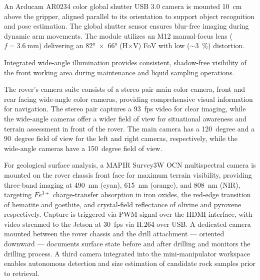 
An Arducam AR0234 color global shutter USB 3.0 camera is mounted \qty{10}{\centi\metre} above the gripper, aligned parallel to its orientation to support object recognition and pose estimation. The global shutter sensor ensures blur-free imaging during dynamic arm movements. The module utilizes an M12 manual-focus lens ($f = \qty{3.6}{\milli\metre}$) delivering an \ang{82}~$\times$~\ang{66} (H$\times$V) FoV with low ($\sim$\qty{3}{\percent}) distortion.

Integrated wide-angle illumination provides consistent, shadow-free visibility of the front working area during maintenance and liquid sampling operations.


The rover's camera suite consists of a stereo pair main color camera, front and rear facing wide-angle color cameras, providing comprehensive visual information for navigation. The stereo pair captures a  \qty{93}{fps} video for clear imaging, while the wide-angle cameras offer a wider field of view for situational awareness and terrain assessment in front of the rover. The main camera has a \qty{120}{degree} and a \qty{90}{degree} field of view for the left and right cameras, respectively, while the wide-angle cameras have a \qty{150}{degree} field of view.

For geological surface analysis, a MAPIR Survey3W OCN multispectral camera is mounted on the rover chassis front face for maximum terrain visibility, providing three-band imaging at \qty{490}{\nano\metre} (cyan), \qty{615}{\nano\metre} (orange), and \qty{808}{\nano\metre} (NIR), targeting $Fe^{3+}$ charge-transfer absorption in iron oxides, the red-edge transition of hematite and goethite, and crystal-field reflectance of olivine and pyroxene respectively. Capture is triggered via PWM signal over the HDMI interface, with video streamed to the Jetson at  \qty{30}{fps} via H.264 over USB. A dedicated camera mounted between the rover chassis and the drill attachment — oriented downward — documents surface state before and after drilling and monitors the drilling process. A third camera integrated into the mini-manipulator workspace enables autonomous detection and size estimation of candidate rock samples prior to retrieval.